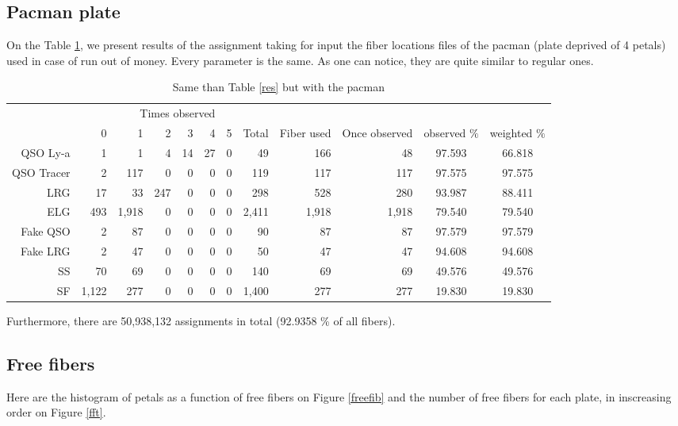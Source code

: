 \documentclass{extarticle}
\begin{document}
\subsection{Pacman plate}
On the Table \ref{pac}, we present results of the assignment taking for input the fiber locations files of the pacman (plate deprived of 4 petals) used in case of run out of money. Every parameter is the same. As one can notice, they are quite similar to regular ones.

\begin{table}[H]\begin{center}
\begin{tabular}{rrrrrrrrrrcc}
\hline
\multicolumn{6}{r}{Times observed} \\
	~ &           0 &     1 &  2 & 3 & 4 & 5 &  Total & Fiber used & Once observed & observed $\%$ & weighted $\%$ \\ \hline
   QSO Ly-a   &     1 &     1 &   4 & 14 & 27 & 0 &    49 &   166 &    48 & 97.593 & 66.818 \\ 
 QSO Tracer   &     2 &   117 &   0 &  0 &  0 & 0 &   119 &   117 &   117 & 97.575 & 97.575 \\ 
        LRG   &    17 &    33 & 247 &  0 &  0 & 0 &   298 &   528 &   280 & 93.987 & 88.411 \\ 
        ELG   &   493 & 1,918 &   0 &  0 &  0 & 0 & 2,411 & 1,918 & 1,918 & 79.540 & 79.540 \\ 
   Fake QSO   &     2 &    87 &   0 &  0 &  0 & 0 &    90 &    87 &    87 & 97.579 & 97.579 \\ 
   Fake LRG   &     2 &    47 &   0 &  0 &  0 & 0 &    50 &    47 &    47 & 94.608 & 94.608 \\ 
         SS   &    70 &    69 &   0 &  0 &  0 & 0 &   140 &    69 &    69 & 49.576 & 49.576 \\ 
         SF   & 1,122 &   277 &   0 &  0 &  0 & 0 & 1,400 &   277 &   277 & 19.830 & 19.830 \\ 
\hline
\end{tabular}
\caption{Same than Table \ref{res} but with the pacman}\label{pac}
\end{center}\end{table}

Furthermore, there are 50,938,132 assignments in total (92.9358 \% of all fibers).

\subsection{Free fibers}
Here are the histogram of petals as a function of free fibers on Figure \ref{freefib} and the number of free fibers for each plate, in inscreasing order on Figure \ref{fft}.
\end{document}
